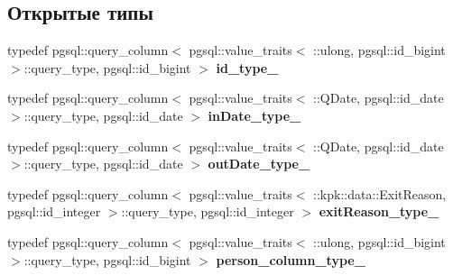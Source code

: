 \subsection*{Открытые типы}
\begin{DoxyCompactItemize}
\item 
typedef pgsql\+::query\+\_\+column$<$ pgsql\+::value\+\_\+traits$<$ \+::ulong, pgsql\+::id\+\_\+bigint $>$\+::query\+\_\+type, pgsql\+::id\+\_\+bigint $>$ {\bfseries id\+\_\+type\+\_\+}\hypertarget{structodb_1_1query__columns_3_01_1_1kpk_1_1data_1_1_member_00_01id__pgsql_00_01_a_01_4_ab3f25a060b3daf48111f84f04c743c9a}{}\label{structodb_1_1query__columns_3_01_1_1kpk_1_1data_1_1_member_00_01id__pgsql_00_01_a_01_4_ab3f25a060b3daf48111f84f04c743c9a}

\item 
typedef pgsql\+::query\+\_\+column$<$ pgsql\+::value\+\_\+traits$<$ \+::Q\+Date, pgsql\+::id\+\_\+date $>$\+::query\+\_\+type, pgsql\+::id\+\_\+date $>$ {\bfseries in\+Date\+\_\+type\+\_\+}\hypertarget{structodb_1_1query__columns_3_01_1_1kpk_1_1data_1_1_member_00_01id__pgsql_00_01_a_01_4_a1e6df047a593e3f8107a376b8f57e194}{}\label{structodb_1_1query__columns_3_01_1_1kpk_1_1data_1_1_member_00_01id__pgsql_00_01_a_01_4_a1e6df047a593e3f8107a376b8f57e194}

\item 
typedef pgsql\+::query\+\_\+column$<$ pgsql\+::value\+\_\+traits$<$ \+::Q\+Date, pgsql\+::id\+\_\+date $>$\+::query\+\_\+type, pgsql\+::id\+\_\+date $>$ {\bfseries out\+Date\+\_\+type\+\_\+}\hypertarget{structodb_1_1query__columns_3_01_1_1kpk_1_1data_1_1_member_00_01id__pgsql_00_01_a_01_4_a73aabf1e614f4b89d1564aca6910b2fd}{}\label{structodb_1_1query__columns_3_01_1_1kpk_1_1data_1_1_member_00_01id__pgsql_00_01_a_01_4_a73aabf1e614f4b89d1564aca6910b2fd}

\item 
typedef pgsql\+::query\+\_\+column$<$ pgsql\+::value\+\_\+traits$<$ \+::kpk\+::data\+::\+Exit\+Reason, pgsql\+::id\+\_\+integer $>$\+::query\+\_\+type, pgsql\+::id\+\_\+integer $>$ {\bfseries exit\+Reason\+\_\+type\+\_\+}\hypertarget{structodb_1_1query__columns_3_01_1_1kpk_1_1data_1_1_member_00_01id__pgsql_00_01_a_01_4_ad69004381237adad67183687d9f3586b}{}\label{structodb_1_1query__columns_3_01_1_1kpk_1_1data_1_1_member_00_01id__pgsql_00_01_a_01_4_ad69004381237adad67183687d9f3586b}

\item 
typedef pgsql\+::query\+\_\+column$<$ pgsql\+::value\+\_\+traits$<$ \+::ulong, pgsql\+::id\+\_\+bigint $>$\+::query\+\_\+type, pgsql\+::id\+\_\+bigint $>$ {\bfseries person\+\_\+column\+\_\+type\+\_\+}\hypertarget{structodb_1_1query__columns_3_01_1_1kpk_1_1data_1_1_member_00_01id__pgsql_00_01_a_01_4_ac7060cfa17c02a49d4d16b4e41de0235}{}\label{structodb_1_1query__columns_3_01_1_1kpk_1_1data_1_1_member_00_01id__pgsql_00_01_a_01_4_ac7060cfa17c02a49d4d16b4e41de0235}


\end{DoxyCompactItemize}
